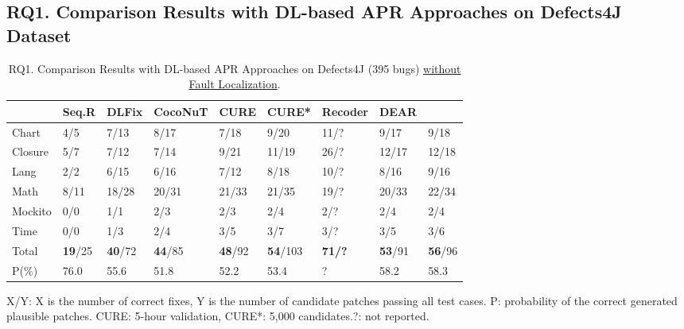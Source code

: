 \subsection{\bf RQ1. Comparison Results with DL-based APR Approaches on Defects4J Dataset}

\begin{table}[t]
  \caption{RQ1. Comparison Results with DL-based APR Approaches on Defects4J (395 bugs) \underline {without Fault Localization}.}
  \vspace{-6pt}
  \tabcolsep 2.5pt
  {\footnotesize
			\begin{center}
				\renewcommand{\arraystretch}{1}
				\begin{tabular}{p{0.7cm}<{\centering}|p{0.7cm}<{\centering}|p{0.7cm}<{\centering}|p{1cm}<{\centering}|p{0.8cm}<{\centering}|p{0.8cm}<{\centering}|p{0.9cm}<{\centering}|p{0.8cm}<{\centering}|p{0.8cm}<{\centering}}
					
					\hline
					&\textbf{Seq.R}&\textbf{DLFix}& \textbf{CocoNuT}&\textbf{CURE}&\textbf{CURE*}&\textbf{Recoder}& {\bf DEAR} & \textbf{\tool}\\
					\hline
					Chart  & 4/5   & 7/13  & 8/17  & 7/18  & 9/20 & 11/? & 9/17 & 9/18\\
					Closure& 5/7   & 7/12  & 7/14  & 9/21 & 11/19  & 26/? & 12/17 & 12/18\\
					Lang   & 2/2   & 6/15  & 6/16  & 7/12 & 8/18 & 10/? & 8/16 & 9/16\\
					Math    & 8/11  & 18/28 & 20/31 & 21/33 & 21/35 & 19/? & 20/33 & 22/34\\
					Mockito & 0/0   & 1/1   & 2/3   & 2/3  &2/4 & 2/? & 2/4 & 2/4\\
					Time    & 0/0   & 1/3   & 2/4   & 3/5  &3/7 & 3/? & 3/5 & 3/6\\
					\hline
					Total   & {\bf 19}/25 & {\bf 40}/72 & {\bf 44}/85 & {\bf 48}/92 & {\bf 54}/103 & {\bf 71/?} &{\bf 53}/91 & {\bf 56}/96\\
					\hline
					P(\%)  & 76.0  & 55.6  & 51.8  & 52.2  &  53.4 & ? & 58.2 & 58.3\\
					\hline
				\end{tabular}
			{\footnotesize{
				X/Y: X is the number of correct fixes, Y is the number of candidate patches passing all test cases. P: probability of the correct generated plausible patches. CURE: 5-hour validation, CURE*: 5,000 candidates.?: not reported.}}

				\label{RQ1_defect4j}
			\end{center}
                }
		\end{table}

